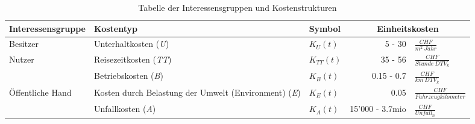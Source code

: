 %
%
%
%

\begin{table}[ht!]
\flushleft
\renewcommand{\arraystretch}{1.4}
%
%
\begin{tabular}{@{}p{3.3cm} p{4cm} p{1.2cm} r l @{}} \\   
\toprule
\textbf{Interessensgruppe} & \textbf{Kostentyp} & \textbf{Symbol} & \multicolumn{2}{c}{\textbf{Einheitskosten}} 			\\
\midrule
Besitzer                   & Unterhaltkosten (\textit{U})                    & $K_{U}(t)$    & 5 - 30 		&	$\frac{CHF}{m^2 \ Jahr}$              \\
Nutzer		               & Reisezeitkosten (\textit{TT})                   & $K_{TT}(t)$   & 35 - 56 		&	$\frac{CHF}{Stunde \ DTV_{k}}$         \\
                           & Betriebskosten (\textit{B})            		 & $K_{B}(t)$    & 0.15 - 0.7 	&	$\frac{CHF}{km \ DTV_{k}}$              \\
Öffentliche Hand           & Kosten durch Belastung \newline der Umwelt \newline (Environment) (\textit{E})   & $K_{E}(t)$    & 0.05  & $\frac{CHF}{Fahrzeugkilometer}$      \\
                           & Unfallkosten (\textit{A})                       & $K_{A}(t)$    & 15'000 - 3.7mio & $\frac{CHF}{Unfall_{n}}$    \\
\bottomrule

\end{tabular}
\caption{Tabelle der Interessensgruppen und Kostenstrukturen}
\label{tab:t-04-01-Interessensgruppen}
\end{table}


%


